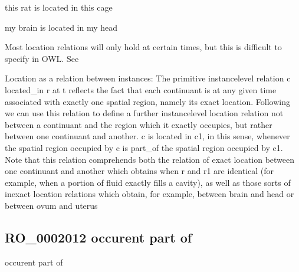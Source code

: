 \documentclass[letterpaper,10pt,english]{sphinxmanual}
\begin{document}
\begin{sphinxShadowBox}

\sphinxAtStartPar
this rat is located in this cage

\sphinxAtStartPar
my brain is located in my head
\end{sphinxShadowBox}

\begin{sphinxShadowBox}

\sphinxAtStartPar
Most location relations will only hold at certain times, but this is difficult to specify in OWL. See 

\sphinxAtStartPar
Location as a relation between instances: The primitive instance\sphinxhyphen{}level relation c located\_in r at t reflects the fact that each continuant is at any given time associated with exactly one spatial region, namely its exact location. Following we can use this relation to define a further instance\sphinxhyphen{}level location relation \sphinxhyphen{} not between a continuant and the region which it exactly occupies, but rather between one continuant and another. c is located in c1, in this sense, whenever the spatial region occupied by c is part\_of the spatial region occupied by c1.    Note that this relation comprehends both the relation of exact location between one continuant and another which obtains when r and r1 are identical (for example, when a portion of fluid exactly fills a cavity), as well as those sorts of inexact location relations which obtain, for example, between brain and head or between ovum and uterus
\end{sphinxShadowBox}

\begin{sphinxShadowBox}

\sphinxAtStartPar
{}
\end{sphinxShadowBox}
\begin{quote}

\ignorespaces \end{quote}


\subsection{RO\_0002012 \sphinxhyphen{} occurent part of}
\label{\detokenize{doc-RO_0002012:ro-0002012-occurent-part-of}}\label{\detokenize{doc-RO_0002012:index-0}}\label{\detokenize{doc-RO_0002012::doc}}
\begin{sphinxShadowBox}

\sphinxAtStartPar
occurent part of
\end{sphinxShadowBox}
\end{document}
